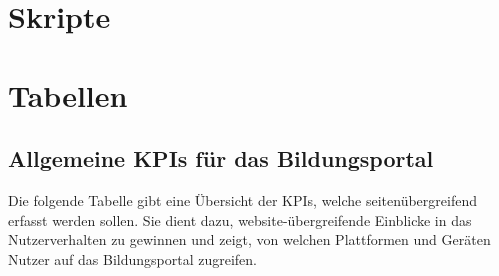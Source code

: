 \appendix


\chapter{Skripte}
\label{ch:skripte}
%	
%	
%	


%	
%	

\chapter{Tabellen}
\label{ch:tabellen}

\section{Allgemeine KPIs für das Bildungsportal}
Die folgende Tabelle gibt eine Übersicht der KPIs, welche seitenübergreifend erfasst werden sollen. Sie dient dazu, website-übergreifende Einblicke in das Nutzerverhalten zu gewinnen und zeigt, von welchen Plattformen und Geräten Nutzer auf das Bildungsportal zugreifen.

